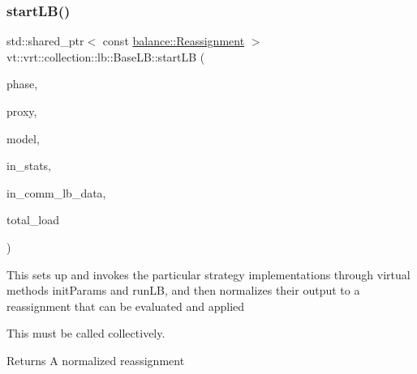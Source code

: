 \mbox{\label{structvt_1_1vrt_1_1collection_1_1lb_1_1_base_l_b_ab9765675eb8432b21fb78f54a169d0af}} 
\subsubsection{\texorpdfstring{start\+L\+B()}{startLB()}}
{\footnotesize\ttfamily std\+::shared\+\_\+ptr$<$ const \hyperlink{structvt_1_1vrt_1_1collection_1_1balance_1_1_reassignment}{balance\+::\+Reassignment} $>$ vt\+::vrt\+::collection\+::lb\+::\+Base\+L\+B\+::start\+LB (\begin{DoxyParamCaption}\item[{\hyperlink{namespacevt_a46ce6733d5cdbd735d561b7b4029f6d7}{Phase\+Type}}]{phase,  }\item[{\hyperlink{structvt_1_1objgroup_1_1proxy_1_1_proxy}{objgroup\+::proxy\+::\+Proxy}$<$ \hyperlink{structvt_1_1vrt_1_1collection_1_1lb_1_1_base_l_b}{Base\+LB} $>$}]{proxy,  }\item[{\hyperlink{structvt_1_1vrt_1_1collection_1_1balance_1_1_load_model}{balance\+::\+Load\+Model} $\ast$}]{model,  }\item[{\hyperlink{structvt_1_1vrt_1_1collection_1_1lb_1_1_base_l_b_acd9bdad961ac83c96b7a227de672f96c}{Statistic\+Map\+Type} const \&}]{in\+\_\+stats,  }\item[{\hyperlink{structvt_1_1vrt_1_1collection_1_1lb_1_1_base_l_b_a83eb4daec14edfb8780422e95b8e38d3}{Element\+Comm\+Type} const \&}]{in\+\_\+comm\+\_\+lb\+\_\+data,  }\item[{\hyperlink{namespacevt_a876a9d0cd5a952859c72de8a46881442}{Time\+Type}}]{total\+\_\+load }\end{DoxyParamCaption})}

This sets up and invokes the particular strategy implementations through virtual methods {\ttfamily init\+Params} and {\ttfamily run\+LB}, and then normalizes their output to a reassignment that can be evaluated and applied

This must be called collectively.

\begin{DoxyReturn}{Returns}
A normalized reassignment 
\end{DoxyReturn}
\mbox{\label{structvt_1_1vrt_1_1collection_1_1lb_1_1_base_l_b_adb9e1197bc690340bc1a4a6c77ac5254}} 
